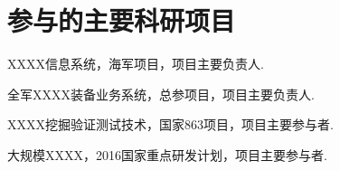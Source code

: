 \begin{resume}
\begin{enumerate}[{[}1{]}]
  
  \end{enumerate}

  \section*{参与的主要科研项目} %
  \begin{enumerate}[{[}1{]}]
  \addtolength{\itemsep}{-.36\baselineskip}%
  \item XXXX信息系统，海军项目，项目主要负责人.
  \item 全军XXXX装备业务系统，总参项目，项目主要负责人.
  \item XXXX挖掘验证测试技术，国家863项目，项目主要参与者.
  \item 大规模XXXX，2016国家重点研发计划，项目主要参与者.
  \end{enumerate}
\end{resume}
